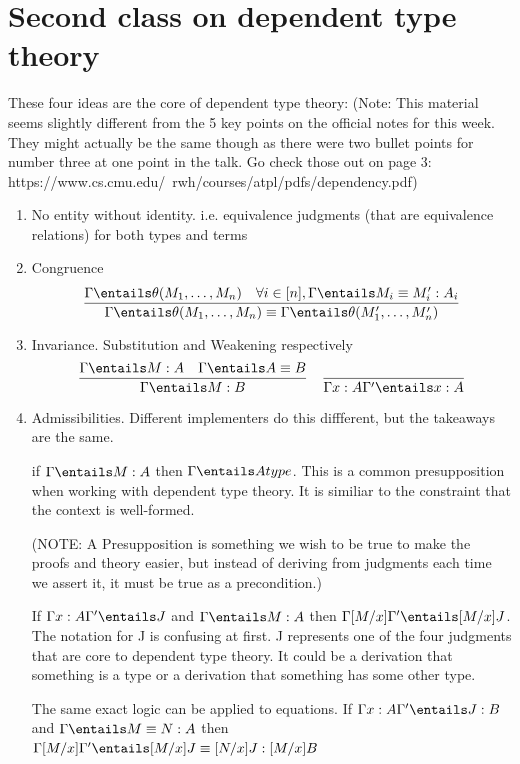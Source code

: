 \documentclass[11pt]{article}
\begin{document}
\section*{Second class on dependent type theory}
These four ideas are the core of dependent type theory: (Note: This material seems slightly different from the 5 key points on the official notes for this week. They might actually be the same though as there were two bullet points for number three at one point in the talk. Go check those out on page 3: https://www.cs.cmu.edu/~rwh/courses/atpl/pdfs/dependency.pdf)
\begin{enumerate}
    \item No entity without identity. i.e. equivalence judgments (that are equivalence relations) for both types and terms
    \item Congruence
    \[
    \frac{\Gamma \entails \theta(M_1, \dots, M_n) \quad \forall i \in [n], \Gamma \entails M_i \equiv M'_i : A_i}{\Gamma \entails \theta(M_1, \dots, M_n) \equiv \Gamma \entails \theta(M'_1, \dots, M'_n) }
    \]
    \item Invariance. Substitution and Weakening respectively
    \[
        \frac{\Gamma \entails M : A \quad \Gamma \entails A \equiv B}{\Gamma \entails M : B} \quad \frac{}{\Gamma x : A \Gamma' \entails x : A}
    \]
    \item Admissibilities. Different implementers do this diffferent, but the takeaways are the same.
    
    if $\Gamma \entails M : A$ then $\Gamma \entails A type$. This is a common presupposition when working with dependent type theory. It is similiar to the constraint that the context is well-formed.

    (NOTE: A Presupposition is something we wish to be true to make the proofs and theory easier, but instead of deriving from judgments each time we assert it, it must be true as a precondition.)

    If $\Gamma x : A \Gamma' \entails J$ and $\Gamma \entails M : A$ then $\Gamma [M / x] \Gamma' \entails [M/x]J$. The notation for J is confusing at first. J represents one of the four judgments that are core to dependent type theory. It could be a derivation that something is a type or a derivation that something has some other type.

    The same exact logic can be applied to equations. If $\Gamma x : A \Gamma' \entails J : B$ and $\Gamma \entails M \equiv N : A$ then $\Gamma [M / x] \Gamma' \entails [M / x] J \equiv [N / x] J: [M/x]B$
    
\end{enumerate}
\end{document}
